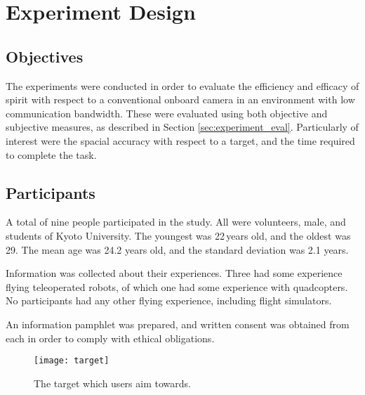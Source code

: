 \chapter{Experiment Design}

\section{Objectives}
  The experiments were conducted in order to evaluate the efficiency and efficacy of \gls{spirit} with respect to a conventional onboard camera in an environment with low communication bandwidth.
  These were evaluated using both objective and subjective measures, as described in Section \ref{sec:experiment_eval}.
  Particularly of interest were the spacial accuracy with respect to a target, and the time required to complete the task.

\section{Participants}
A total of nine people participated in the study.
All were volunteers, male, and students of Kyoto University.
The youngest was 22\,years old, and the oldest was 29.
The mean age was 24.2 years old, and the standard deviation was 2.1 years.

Information was collected about their experiences.
Three had some experience flying teleoperated robots, of which one had some experience with quadcopters.
No participants had any other flying experience, including flight simulators.

An information pamphlet was prepared, and written consent was obtained from each in order to comply with ethical obligations.

\begin{wrapfigure}{r}{0.47\textwidth}
  \centering
  \texttt{[image: target]}
  \caption[Target]{
    The target which users aim towards.
  }
  \label{fig:target}
\end{wrapfigure}

